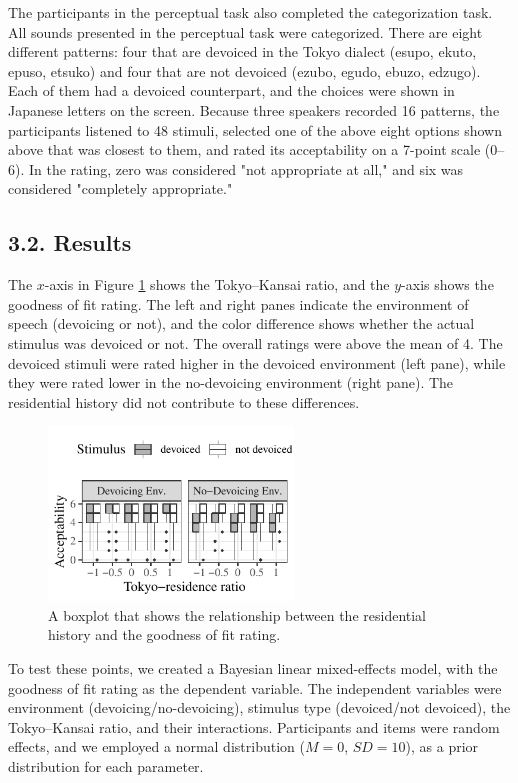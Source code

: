 \documentclass[a4paper,11pt,twocolumn]{article}
\begin{document}
The participants in the perceptual task also completed the categorization task. All sounds presented in the perceptual task were categorized. There are eight different patterns: four that are devoiced in the Tokyo dialect (esupo, ekuto, epuso, etsuko) and four that are not devoiced (ezubo, egudo, ebuzo, edzugo). Each of them had a devoiced counterpart, and the choices were shown in Japanese letters on the screen. Because three speakers recorded 16 patterns, the participants listened to 48 stimuli, selected one of the above eight options shown above that was closest to them, and rated its acceptability on a 7-point scale (0--6). In the rating, zero was considered "not appropriate at all," and six was considered "completely appropriate."

\subsection{3.2. Results}

The $x$-axis in Figure \ref{fig:cat_results} shows the Tokyo--Kansai ratio, and the $y$-axis shows the goodness of fit rating. The left and right panes indicate the environment of speech (devoicing or not), and the color difference shows whether the actual stimulus was devoiced or not. The overall ratings were above the mean of 4. The devoiced stimuli were rated higher in the devoiced environment (left pane), while they were rated lower in the no-devoicing environment (right pane). The residential history did not contribute to these differences.
\begin{figure}[!ht]
\begin{center}
\includegraphics[width=6.5cm]{../results/artifact/results_categorization.pdf}
\caption{A boxplot that shows the relationship between the residential history and the goodness of fit rating.}\label{fig:cat_results}
\end{center}
\end{figure}

To test these points, we created a Bayesian linear mixed-effects model, with the goodness of fit rating as the dependent variable. The independent variables were environment (devoicing/no-devoicing), stimulus type (devoiced/not devoiced), the Tokyo--Kansai ratio, and their interactions. Participants and items were random effects, and we employed a normal distribution ($M=0$, $SD=10$), as a prior distribution for each parameter.
\end{document}
